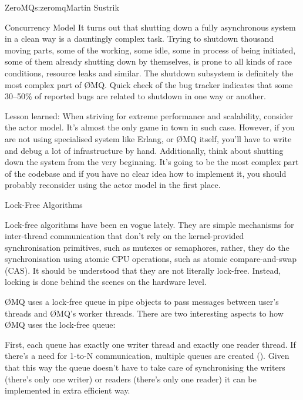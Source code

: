 \begin{aosachapter}{ZeroMQ}{s:zeromq}{Martin Sustrik}
\begin{aosasect1}{Concurrency Model}
It turns out that shutting down a fully asynchronous system in a clean
way is a dauntingly complex task. Trying to shutdown thousand moving
parts, some of the working, some idle, some in process of being
initiated, some of them already shutting down by themselves, is prone
to all kinds of race conditions, resource leaks and similar. The
shutdown subsystem is definitely the most complex part of {\O}MQ. Quick
check of the bug tracker indicates that some 30--50\% of reported bugs
are related to shutdown in one way or another.

Lesson learned: When striving for extreme performance and scalability,
consider the actor model. It's almost the only game in town in such
case. However, if you are not using specialised system like Erlang, or
{\O}MQ itself, you'll have to write and debug a lot of infrastructure by
hand. Additionally, think about shutting down the system from the very
beginning. It's going to be the most complex part of the codebase and
if you have no clear idea how to implement it, you should probably
reconsider using the actor model in the first place.

\end{aosasect1}

\begin{aosasect1}{Lock-Free Algorithms}

Lock-free algorithms have been en vogue lately. They are simple
mechanisms for inter-thread communication that don't rely on the
kernel-provided synchronisation primitives, such as mutexes or
semaphores, rather, they do the synchronisation using atomic CPU
operations, such as atomic compare-and-swap (CAS). It should be
understood that they are not literally lock-free. Instead, locking is
done behind the scenes on the hardware level.

{\O}MQ uses a lock-free queue in pipe objects to pass messages between
user's threads and {\O}MQ's worker threads. There are two interesting
aspects to how {\O}MQ uses the lock-free queue:

First, each queue has exactly one writer thread and exactly one reader
thread. If there's a need for 1-to-N communication, multiple queues
are created ().  Given that this way
the queue doesn't have to take care of synchronising the writers
(there's only one writer) or readers (there's only one reader) it can
be implemented in extra efficient way.



\end{aosasect1}
\end{aosachapter}

